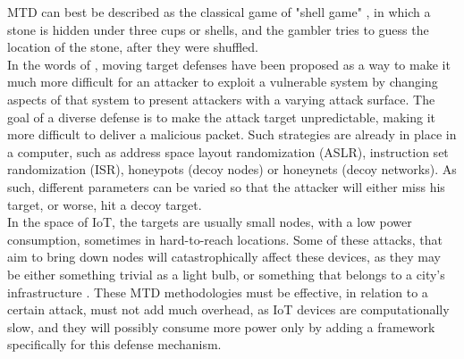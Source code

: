 MTD can best be described as the classical game of "shell game" \cite{cho2019proactive}, in which a stone is hidden under three cups or shells, and the gambler tries to guess the location of the stone, after they were shuffled.\\
In the words of \cite{mtd_vol1}, moving target defenses have been proposed as a way to make it much more difficult for an attacker to exploit a vulnerable system by changing aspects of that system to present attackers with a varying attack surface. The goal of a diverse defense is to make the attack target unpredictable, making it more difficult to deliver a malicious packet. Such strategies are already in place in a computer, such as address space layout randomization (ASLR), instruction set randomization (ISR), honeypots (decoy nodes) or honeynets (decoy networks). As such, different parameters can be varied so that the attacker will either miss his target, or worse, hit a decoy target.\\
In the space of IoT, the targets are usually small nodes, with a low power consumption, sometimes in hard-to-reach locations. Some of these attacks, that aim to bring down nodes will catastrophically affect these devices, as they may be either something trivial as a light bulb, or something that belongs to a city's infrastructure \cite{iot_electric_grid}. These MTD methodologies must be effective, in relation to a certain attack, must not add much overhead, as IoT devices are computationally slow, and they will possibly consume more power only by adding a framework specifically for this defense mechanism.